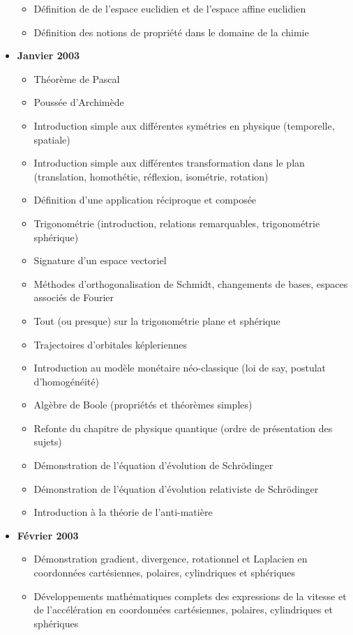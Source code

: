 \documentclass[12pt,a4paper,twoside,openright]{report}
\theoremstyle{definition}
\theoremstyle{itexmp}
\numberwithin{equation}{section}
\begin{document}
\begin{itemize}
\begin{itemize}[noitemsep]
				\item Définition de de l'espace euclidien et de l'espace affine euclidien
				\item Définition des notions de propriété dans le domaine de la chimie
			\end{itemize}
			\item \textbf{Janvier 2003}
			\begin{itemize}[noitemsep]
				\item Théorème de Pascal
				\item Poussée d'Archimède
				\item Introduction simple aux différentes symétries en physique (temporelle, spatiale)
				\item Introduction simple aux différentes transformation dans le plan (translation, homothétie, réflexion, isométrie, rotation)
				\item Définition d'une application réciproque et composée
				\item Trigonométrie (introduction, relations remarquables, trigonométrie sphérique)
				\item Signature d'un espace vectoriel
				\item Méthodes d'orthogonalisation de Schmidt, changements de bases, espaces associés de Fourier
				\item Tout (ou presque) sur la trigonométrie plane et sphérique
				\item Trajectoires d'orbitales képleriennes
				\item Introduction au modèle monétaire néo-classique (loi de say, postulat d'homogénéité)
				\item Algèbre de Boole (propriétés et théorèmes simples)
				\item Refonte du chapitre de physique quantique (ordre de présentation des sujets)
				\item Démonstration de l'équation d'évolution de Schrödinger
				\item Démonstration de l'équation d'évolution relativiste de Schrödinger
				\item Introduction à la théorie de l'anti-matière
			\end{itemize}
		\item \textbf{Février 2003}
				\begin{itemize}[noitemsep]
				\item Démonstration gradient, divergence, rotationnel et Laplacien en coordonnées cartésiennes, polaires, cylindriques et sphériques
				\item Développements mathématiques complets des expressions de la vitesse et de l'accélération en coordonnées cartésiennes, polaires, cylindriques et sphériques

\end{itemize}
\end{itemize}
\end{document}
